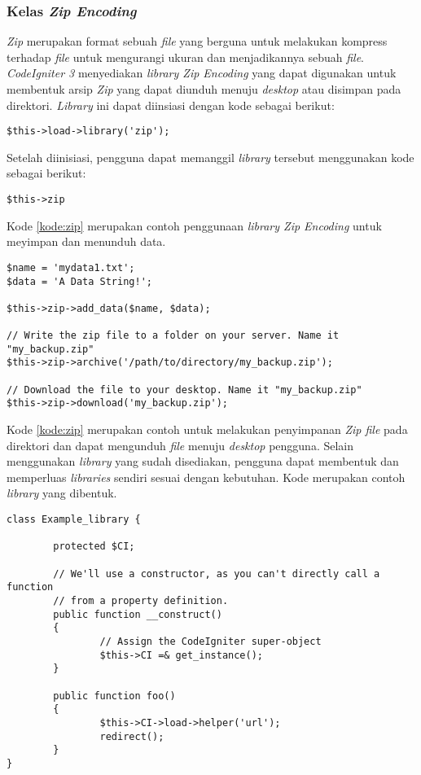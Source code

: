\subsubsection{Kelas \textit{Zip Encoding}}
\textit{Zip} merupakan format sebuah \textit{file} yang berguna untuk melakukan kompress terhadap \textit{file} untuk mengurangi ukuran dan menjadikannya sebuah \textit{file}. \textit{CodeIgniter 3} menyediakan \textit{library Zip Encoding} yang dapat digunakan untuk membentuk arsip \textit{Zip} yang dapat diunduh menuju \textit{desktop} atau disimpan pada direktori. \textit{Library} ini dapat diinsiasi dengan kode sebagai berikut:

\begin{center}
\verb|$this->load->library('zip');|
\end{center}

Setelah diinisiasi, pengguna dapat memanggil \textit{library} tersebut menggunakan kode sebagai berikut:

\begin{center}
\verb|$this->zip|
\end{center}

Kode \ref{kode:zip} merupakan contoh penggunaan \textit{library Zip Encoding} untuk meyimpan dan menunduh data.

\begin{lstlisting}[caption=Contoh penggunaan \textit{library Zip Encoding}, label=kode:zip]
$name = 'mydata1.txt';
$data = 'A Data String!';

$this->zip->add_data($name, $data);

// Write the zip file to a folder on your server. Name it "my_backup.zip"
$this->zip->archive('/path/to/directory/my_backup.zip');

// Download the file to your desktop. Name it "my_backup.zip"
$this->zip->download('my_backup.zip');
\end{lstlisting}

Kode \ref{kode:zip} merupakan contoh untuk melakukan penyimpanan \textit{Zip file} pada direktori dan dapat mengunduh \textit{file} menuju \textit{desktop} pengguna. Selain menggunakan \textit{library} yang sudah disediakan, pengguna dapat membentuk dan memperluas \textit{libraries} sendiri sesuai dengan kebutuhan. Kode merupakan contoh \textit{library} yang dibentuk.

\begin{lstlisting}[caption=Contoh \textit{library} yang dibentuk, label=kode:newlib]
class Example_library {

        protected $CI;

        // We'll use a constructor, as you can't directly call a function
        // from a property definition.
        public function __construct()
        {
                // Assign the CodeIgniter super-object
                $this->CI =& get_instance();
        }

        public function foo()
        {
                $this->CI->load->helper('url');
                redirect();
        }
}
\end{lstlisting}

